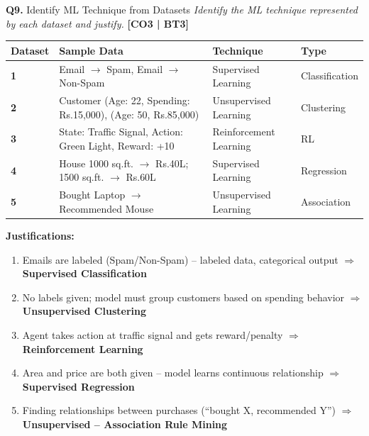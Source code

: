 \documentclass[12pt,a4paper]{article}
\newcommand{\Qno}[1]{\textbf{\color{darkred}Q#1.}}
\newcommand{\term}[1]{\textbf{\color{headingcolor}#1}}
\newcommand{\rupee}{\textrm{Rs.}}
\begin{document}
\begin{questionbox}{\Qno{9} Identify ML Technique from Datasets}
\textit{Identify the ML technique represented by each dataset and justify.} \hfill \textbf{[CO3 | BT3]}
\end{questionbox}

\begin{answerenv}

\begin{center}
\begin{tabular}{>{\bfseries}p{1cm} p{6.5cm} p{3cm} p{2cm}}
\toprule
\textbf{Dataset} & \textbf{Sample Data} & \textbf{Technique} & \textbf{Type} \\
\midrule
1 & Email $\to$ Spam, Email $\to$ Non-Spam & Supervised Learning & Classification \\[4pt]
2 & Customer (Age: 22, Spending: \textrm{\rupee}15,000), (Age: 50, \textrm{\rupee}85,000) & Unsupervised Learning & Clustering \\[4pt]
3 & State: Traffic Signal, Action: Green Light, Reward: +10 & Reinforcement Learning & RL \\[4pt]
4 & House 1000 sq.ft. $\to$ \textrm{\rupee}40L; 1500 sq.ft. $\to$ \textrm{\rupee}60L & Supervised Learning & Regression \\[4pt]
5 & Bought Laptop $\to$ Recommended Mouse & Unsupervised Learning & Association \\
\bottomrule
\end{tabular}
\end{center}

\textbf{\color{headingcolor}Justifications:}
\begin{enumerate}[leftmargin=1.8em, itemsep=4pt]
  \item Emails are labeled (Spam/Non-Spam) -- labeled data, categorical output $\Rightarrow$ \term{Supervised Classification}
  \item No labels given; model must group customers based on spending behavior $\Rightarrow$ \term{Unsupervised Clustering}
  \item Agent takes action at traffic signal and gets reward/penalty $\Rightarrow$ \term{Reinforcement Learning}
  \item Area and price are both given -- model learns continuous relationship $\Rightarrow$ \term{Supervised Regression}
  \item Finding relationships between purchases (``bought X, recommended Y'') $\Rightarrow$ \term{Unsupervised -- Association Rule Mining}
\end{enumerate}

\end{answerenv}
\end{document}
